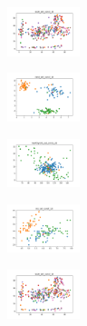 \begin{figure}[H]
    \hfill
    \begin{subfigure}
        \centering
        \includegraphics[width=0.234\textwidth]{img/hs-ls-v2/ecoli_set_const_10_589741062_clust.png}
    \end{subfigure}
    \hfill
    \begin{subfigure}
        \centering
        \includegraphics[width=0.234\textwidth]{img/hs-ls-v2/rand_set_const_10_589741062_clust.png}
    \end{subfigure}
    \hfill
    \begin{subfigure}
        \centering
        \includegraphics[width=0.234\textwidth]{img/hs-ls-v2/newthyroid_set_const_10_589741062_clust.png}
    \end{subfigure}
    \hfill
    \begin{subfigure}
        \centering
        \includegraphics[width=0.234\textwidth]{img/hs-ls-v2/iris_set_const_10_277451237_clust.png}
    \end{subfigure}
    \hfill
    \begin{subfigure}
        \centering
        \includegraphics[width=0.234\textwidth]{img/hs-ls-v2/ecoli_set_const_10_277451237_clust.png}
    \end{subfigure}
    \hfill
    \begin{subfigure}

\end{subfigure}
\end{figure}
